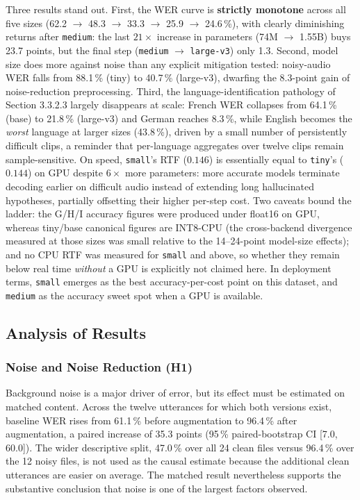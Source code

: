 \documentclass[12pt]{report}
\begin{document}
Three results stand out. First, the WER curve is \textbf{strictly monotone} across all five sizes (62.2 $\to$ 48.3 $\to$ 33.3 $\to$ 25.9 $\to$ 24.6\,\%), with clearly diminishing returns after \texttt{medium}: the last $21\times$ increase in parameters (74M $\to$ 1.55B) buys 23.7 points, but the final step (\texttt{medium} $\to$ \texttt{large-v3}) only 1.3. Second, model size does more against noise than any explicit mitigation tested: noisy-audio WER falls from 88.1\,\% (tiny) to 40.7\,\% (large-v3), dwarfing the 8.3-point gain of noise-reduction preprocessing. Third, the language-identification pathology of Section 3.3.2.3 largely disappears at scale: French WER collapses from 64.1\,\% (base) to 21.8\,\% (large-v3) and German reaches 8.3\,\%, while English becomes the \emph{worst} language at larger sizes (43.8\,\%), driven by a small number of persistently difficult clips, a reminder that per-language aggregates over twelve clips remain sample-sensitive. On speed, \texttt{small}'s RTF ($0.146$) is essentially equal to \texttt{tiny}'s ($0.144$) on GPU despite $6\times$ more parameters: more accurate models terminate decoding earlier on difficult audio instead of extending long hallucinated hypotheses, partially offsetting their higher per-step cost. Two caveats bound the ladder: the G/H/I accuracy figures were produced under float16 on GPU, whereas tiny/base canonical figures are INT8-CPU (the cross-backend divergence measured at those sizes was small relative to the 14--24-point model-size effects); and no CPU RTF was measured for \texttt{small} and above, so whether they remain below real time \emph{without} a GPU is explicitly not claimed here. In deployment terms, \texttt{small} emerges as the best accuracy-per-cost point on this dataset, and \texttt{medium} as the accuracy sweet spot when a GPU is available.
\subsection{Analysis of Results}
\subsubsection{Noise and Noise Reduction (H1)}
Background noise is a major driver of error, but its effect must be estimated on matched content. Across the twelve utterances for which both versions exist, baseline WER rises from 61.1\,\% before augmentation to 96.4\,\% after augmentation, a paired increase of 35.3 points (95\,\% paired-bootstrap CI [7.0, 60.0]). The wider descriptive split, 47.0\,\% over all 24 clean files versus 96.4\,\% over the 12 noisy files, is not used as the causal estimate because the additional clean utterances are easier on average. The matched result nevertheless supports the substantive conclusion that noise is one of the largest factors observed.
\end{document}
